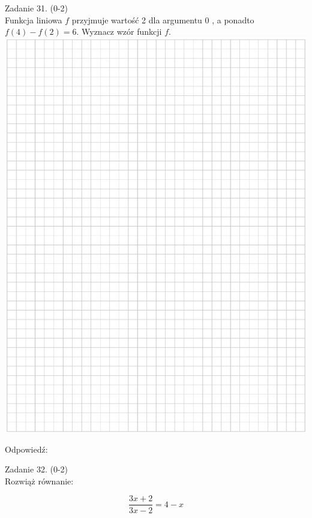 \documentclass[10pt]{article}
\begin{document}
Zadanie 31. (0-2)\\
Funkcja liniowa \(f\) przyjmuje wartość 2 dla argumentu 0 , a ponadto \(f(4)-f(2)=6\). Wyznacz wzór funkcji \(f\).\\
\includegraphics[max width=\textwidth, center]{2024_11_21_46d945490f1b2eff1c8eg-18}

Odpowiedź: \(\qquad\)

Zadanie 32. (0-2)\\
Rozwiąż równanie:

\[
\frac{3 x+2}{3 x-2}=4-x
\]
\end{document}
